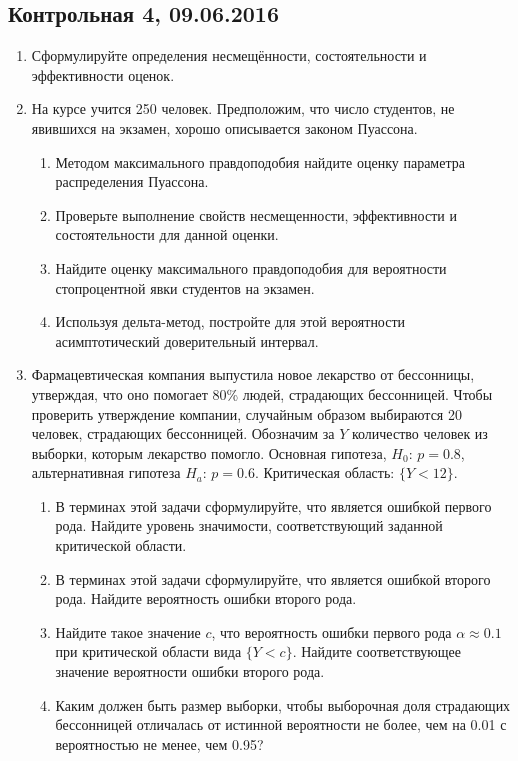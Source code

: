 \subsection{Контрольная 4, 09.06.2016}

\begin{enumerate}
\item	Сформулируйте определения несмещённости, состоятельности и эффективности оценок.

\item На курсе учится 250 человек. Предположим, что число студентов, не явившихся на экзамен, хорошо описывается законом Пуассона.
\begin{enumerate}
\item	Методом максимального правдоподобия найдите оценку параметра распределения Пуассона.
\item	Проверьте выполнение свойств несмещенности, эффективности и состоятельности для данной оценки.
\item	Найдите оценку максимального правдоподобия для вероятности стопроцентной явки студентов на экзамен.
\item	Используя дельта-метод, постройте для этой вероятности асимптотический доверительный интервал.
\end{enumerate}

\item	Фармацевтическая компания выпустила новое лекарство от бессонницы, утверждая, что оно помогает 80\% людей, страдающих бессонницей. Чтобы проверить утверждение компании, случайным образом выбираются 20 человек, страдающих бессонницей. Обозначим за $Y$ количество человек из выборки, которым лекарство помогло. Основная гипотеза, $H_0$: $p=0.8$, альтернативная гипотеза $H_a$: $p=0.6$. Критическая область: $\{Y<12\}$.
\begin{enumerate}
\item	В терминах этой задачи сформулируйте, что является ошибкой первого рода.
Найдите уровень значимости, соответствующий заданной критической области.
\item	В терминах этой задачи сформулируйте, что является ошибкой второго рода.
Найдите вероятность ошибки второго рода.
\item	Найдите такое значение $c$, что вероятность ошибки первого рода $\alpha \approx 0.1$ при критической области вида $\{Y<c\}$. Найдите соответствующее значение вероятности ошибки второго рода.
\item	Каким должен быть размер выборки, чтобы выборочная доля страдающих бессонницей отличалась от истинной вероятности не более, чем на 0.01 с вероятностью не менее, чем 0.95?
\end{enumerate}


\end{enumerate}
